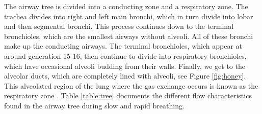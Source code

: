 The airway tree is divided into a conducting zone and a respiratory zone. The trachea divides into right and left main bronchi, which in turn divide into lobar and then segmental bronchi. This process continues down to the terminal bronchioles, which are the smallest airways without alveoli. All of these bronchi make up the conducting airways. %
The terminal bronchioles, which appear at around generation 15-16, then continue to divide into respiratory bronchioles, which have occasional alveoli budding from their walls. Finally, we get to the alveolar ducts, which are completely lined with alveoli, see Figure \ref{fig:honey}. This alveolated region of the lung where the gas exchange occurs is known as the respiratory zone \cite{west2008respiratory}. Table \ref{table:tree} documents the different flow characteristics found in the airway tree during slow and rapid breathing.
%
%
